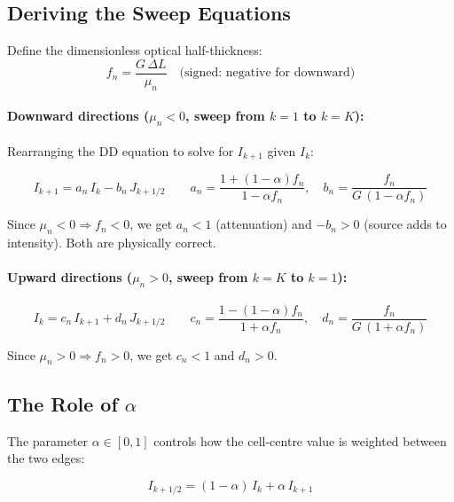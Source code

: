 \documentclass[12pt]{article}
\begin{document}
\subsection{Deriving the Sweep Equations}

Define the dimensionless optical half-thickness:
\begin{equation}
  f_n = \frac{G\,\Delta L}{\mu_n} \quad\text{(signed: negative for downward)}
\end{equation}

\paragraph{Downward directions ($\mu_n < 0$, sweep from $k=1$ to $k=K$):}

Rearranging the DD equation to solve for $I_{k+1}$ given $I_k$:

\begin{equation}
  \boxed{
  I_{k+1} = a_n\,I_k - b_n\,J_{k+1/2}
  }
  \qquad
  a_n = \frac{1+(1-\alpha)f_n}{1-\alpha f_n},
  \quad
  b_n = \frac{f_n}{G\,(1-\alpha f_n)}
\end{equation}

Since $\mu_n < 0 \Rightarrow f_n < 0$, we get $a_n < 1$ (attenuation) and
$-b_n > 0$ (source adds to intensity). Both are physically correct.

\paragraph{Upward directions ($\mu_n > 0$, sweep from $k=K$ to $k=1$):}

\begin{equation}
  \boxed{
  I_k = c_n\,I_{k+1} + d_n\,J_{k+1/2}
  }
  \qquad
  c_n = \frac{1-(1-\alpha)f_n}{1+\alpha f_n},
  \quad
  d_n = \frac{f_n}{G\,(1+\alpha f_n)}
\end{equation}

Since $\mu_n > 0 \Rightarrow f_n > 0$, we get $c_n < 1$ and $d_n > 0$.

\subsection{The Role of $\alpha$}

The parameter $\alpha \in [0, 1]$ controls how the cell-centre value is
weighted between the two edges:

\begin{equation}
  I_{k+1/2} = (1-\alpha)\,I_k + \alpha\,I_{k+1}
\end{equation}
\end{document}
